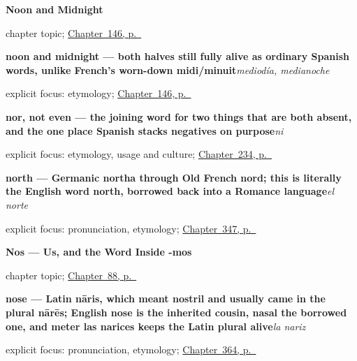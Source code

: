 \noindent\begin{minipage}[t]{\linewidth}
\raggedright
\textbf{Noon and Midnight}\par
\footnotesize chapter topic; \hyperref[ch:spanish-noon-midnight]{Chapter~146, p.~\pageref*{ch:spanish-noon-midnight}}
\end{minipage}\par\smallskip

\noindent\begin{minipage}[t]{\linewidth}
\raggedright
\textbf{noon and midnight — both halves still fully alive as ordinary Spanish words, unlike French's worn-down midi/minuit}\enspace\emph{mediodía, medianoche}\par
\footnotesize explicit focus: etymology; \hyperref[ch:spanish-noon-midnight]{Chapter~146, p.~\pageref*{ch:spanish-noon-midnight}}
\end{minipage}\par\smallskip

\noindent\begin{minipage}[t]{\linewidth}
\raggedright
\textbf{nor, not even — the joining word for two things that are both absent, and the one place Spanish stacks negatives on purpose}\enspace\emph{ni}\par
\footnotesize explicit focus: etymology, usage and culture; \hyperref[ch:ni]{Chapter~234, p.~\pageref*{ch:ni}}
\end{minipage}\par\smallskip

\noindent\begin{minipage}[t]{\linewidth}
\raggedright
\textbf{north — Germanic northa through Old French nord; this is literally the English word north, borrowed back into a Romance language}\enspace\emph{el norte}\par
\footnotesize explicit focus: pronunciation, etymology; \hyperref[ch:el-norte-y-el-sur]{Chapter~347, p.~\pageref*{ch:el-norte-y-el-sur}}
\end{minipage}\par\smallskip

\noindent\begin{minipage}[t]{\linewidth}
\raggedright
\textbf{Nos --- Us, and the Word Inside -mos}\par
\footnotesize chapter topic; \hyperref[ch:pronoun-nos]{Chapter~88, p.~\pageref*{ch:pronoun-nos}}
\end{minipage}\par\smallskip

\noindent\begin{minipage}[t]{\linewidth}
\raggedright
\textbf{nose — Latin nāris, which meant nostril and usually came in the plural nārēs; English nose is the inherited cousin, nasal the borrowed one, and meter las narices keeps the Latin plural alive}\enspace\emph{la nariz}\par
\footnotesize explicit focus: pronunciation, etymology; \hyperref[ch:la-mujer-y-la-cara]{Chapter~364, p.~\pageref*{ch:la-mujer-y-la-cara}}
\end{minipage}\par\smallskip

